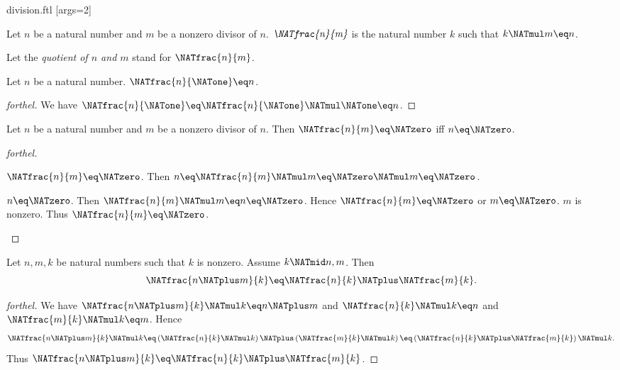\documentclass{stex}
\begin{document}
\begin{smodule}{division.ftl}
[args=2]{}

\begin{definition}[forthel,id=ARITHMETIC_14_2313654268297915]
  Let $n$ be a natural number and $m$ be a nonzero divisor of $n$.
  $\emph{\NATfrac{n}{m}}$ is the natural number $k$ such that $k \NATmul m \eq n$.

  Let the \emph{quotient of $n$ and $m$} stand for $\NATfrac{n}{m}$.
\end{definition}

\begin{proposition}[forthel,id=ARITHMETIC_14_0843793254698710]
  Let $n$ be a natural number.
  $\NATfrac{n}{\NATone} \eq n$.
\end{proposition}
\begin{proof}[forthel]
  We have $\NATfrac{n}{\NATone}
    \eq \NATfrac{n}{\NATone} \NATmul \NATone
    \eq n$.
\end{proof}

\begin{proposition}[forthel,id=ARITHMETIC_14_1254235698632545]
  Let $n$ be a natural number and $m$ be a nonzero divisor of $n$.
  Then $\NATfrac{n}{m} \eq \NATzero$ iff $n \eq \NATzero$.
\end{proposition}
\begin{proof}[forthel]
  \begin{case}{$\NATfrac{n}{m} \eq \NATzero$.}
    Then $n
      \eq \NATfrac{n}{m} \NATmul m
      \eq \NATzero \NATmul m
      \eq \NATzero$.
  \end{case}

  \begin{case}{$n \eq \NATzero$.}
    Then $\NATfrac{n}{m} \NATmul m
      \eq n
      \eq \NATzero$.
    Hence $\NATfrac{n}{m} \eq \NATzero$ or $m \eq \NATzero$.
    $m$ is nonzero.
    Thus $\NATfrac{n}{m} \eq \NATzero$.
  \end{case}
\end{proof}

\begin{proposition}[forthel,id=ARITHMETIC_14_5137961454123875]
  Let $n, m, k$ be natural numbers such that $k$ is nonzero.
  Assume $k \NATmid n,m$.
  Then \[\NATfrac{n \NATplus m}{k} \eq \NATfrac{n}{k} \NATplus \NATfrac{m}{k}.\]
\end{proposition}
\begin{proof}[forthel]
  We have $\NATfrac{n \NATplus m}{k} \NATmul k \eq n \NATplus m$ and $\NATfrac{n}{k} \NATmul k \eq n$ and $\NATfrac{m}{k} \NATmul k \eq m$.
  Hence
  \[  \NATfrac{n \NATplus m}{k} \NATmul k
      \eq \left( \NATfrac{n}{k} \NATmul k \right) \NATplus \left( \NATfrac{m}{k} \NATmul k \right)
      \eq \left( \NATfrac{n}{k} \NATplus \NATfrac{m}{k} \right) \NATmul k. \]
  Thus $\NATfrac{n \NATplus m}{k} \eq \NATfrac{n}{k} \NATplus \NATfrac{m}{k}$.
\end{proof}


\end{smodule}
\end{document}
